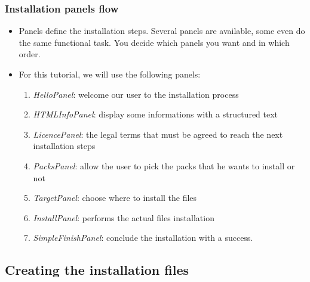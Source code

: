 \documentclass{beamer}
\begin{document}
\begin{frame}

\frametitle{Installation panels flow}

\begin{itemize}

  \item Panels define the installation steps. Several panels are available, some
  even do the same functional task.
  \alert{You decide which panels you want and in which order.}

  \item For this tutorial, we will use the following panels:
    \begin{enumerate}

      \item \textsl{HelloPanel}: welcome our user to the installation process

      \item \textsl{HTMLInfoPanel}: display some informations with a structured
      text

      \item \textsl{LicencePanel}: the legal terms that must be agreed to reach
      the next installation steps

      \item \textsl{PacksPanel}: allow the user to pick the packs that he wants
      to install or not

      \item \textsl{TargetPanel}: choose where to install the files

      \item \textsl{InstallPanel}: performs the actual files installation

      \item \textsl{SimpleFinishPanel}: conclude the installation with a success.

    \end{enumerate}

\end{itemize}

\end{frame}


\subsection{Creating the installation files}
\end{document}
